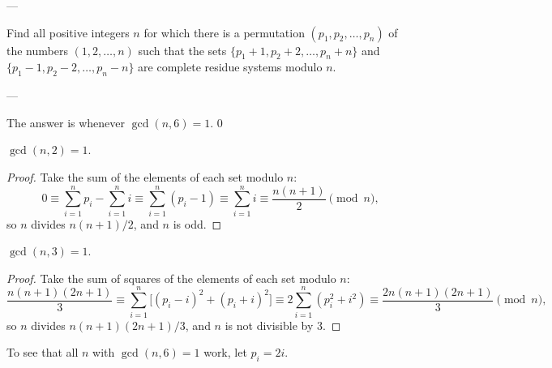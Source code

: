 
---

Find all positive integers $n$ for which there is a permutation $(p_1,p_2,\ldots,p_n)$ of the numbers $(1,2,\ldots,n)$ such that the sets $\{p_1+1,p_2+2,\ldots,p_n+n\}$ and $\{p_1-1,p_2-2,\ldots,p_n-n\}$ are complete residue systems modulo $n$.

---

The answer is whenever $\gcd(n,6)=1$. 
\setcounter{iclaim}0
\begin{iclaim}
    $\gcd(n,2)=1$.
\end{iclaim}
\begin{proof}
    Take the sum of the elements of each set modulo $n$: \[0\equiv\sum_{i=1}^np_i-\sum_{i=1}^ni\equiv\sum_{i=1}^n(p_i-1)\equiv\sum_{i=1}^ni\equiv\frac{n(n+1)}2\pmod n,\]
    so $n$ divides $n(n+1)/2$, and $n$ is odd.
\end{proof}
\begin{iclaim}
    $\gcd(n,3)=1$.
\end{iclaim}
\begin{proof}
    Take the sum of squares of the elements of each set modulo $n$: \[\frac{n(n+1)(2n+1)}3\equiv\sum_{i=1}^n\Big[(p_i-i)^2+(p_i+i)^2\Big]\equiv2\sum_{i=1}^n\left(p_i^2+i^2\right)\equiv\frac{2n(n+1)(2n+1)}3\pmod n,\]
    so $n$ divides $n(n+1)(2n+1)/3$, and $n$ is not divisible by $3$.
\end{proof}

To see that all $n$ with $\gcd(n,6)=1$ work, let $p_i=2i$. 
